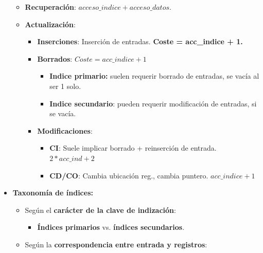 \documentclass[12pt, twoside, openright]{report} %
\begin{document}
\begin{itemize}
\begin{itemize}
    \item \textbf{Recuperación}: $acceso\_indice + acceso\_datos$.
      
    \item \textbf{Actualización}:
      

      \begin{itemize}
      \item \textbf{Inserciones}: Inserción de entradas. \textbf{Coste =
        acc\_indice + 1.}
        
      \item \textbf{Borrados}: $Coste = acc\_indice + 1$
        

        \begin{itemize}
        \item \textbf{Indice primario:} suelen requerir borrado de entradas,
          se vacía al ser 1 solo.
          
        \item \textbf{Indice secundario}: pueden requerir modificación de
          entradas, si se vacía.
          
        \end{itemize}
      \item \textbf{Modificaciones}:
        

        \begin{itemize}
        \item \textbf{CI}: Suele implicar borrado + reinserción de entrada.
          $2*acc\_ind + 2$
          
        \item \textbf{CD/CO}: Cambia ubicación reg., cambia puntero.
          $acc\_indice + 1$
          
        \end{itemize}
      \end{itemize}
    \end{itemize}
  \item \textbf{Taxonomía de índices:}
    

    \begin{itemize}
    \item Según el \textbf{carácter de la clave de indización}:
      

      \begin{itemize}
      \item \textbf{Índices primarios} vs. \textbf{índices secundarios}.
        
      \end{itemize}
    \item Según la \textbf{correspondencia entre entrada y registros}:
      


\end{itemize}
\end{itemize}
\end{document}
